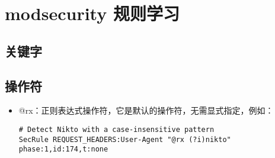 \section{modsecurity 规则学习}

\subsection{关键字}

\subsection{操作符}

\begin{itemize}
\item {\cf @rx}：正则表达式操作符，它是默认的操作符，无需显式指定，例如：

\begin{lstlisting}
# Detect Nikto with a case-insensitive pattern 
SecRule REQUEST_HEADERS:User-Agent "@rx (?i)nikto" phase:1,id:174,t:none
\end{lstlisting}

\end{itemize}
